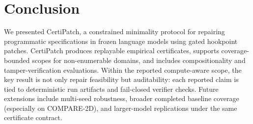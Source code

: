 \section{Conclusion}
We presented CertiPatch, a constrained minimality protocol for repairing programmatic specifications in frozen language models using gated hookpoint patches.
CertiPatch produces replayable empirical certificates, supports coverage-bounded scopes for non-enumerable domains, and includes compositionality and tamper-verification evaluations.
Within the reported compute-aware scope, the key result is not only repair feasibility but auditability: each reported claim is tied to deterministic run artifacts and fail-closed verifier checks.
Future extensions include multi-seed robustness, broader completed baseline coverage (especially on COMPARE-2D), and larger-model replications under the same certificate contract.
